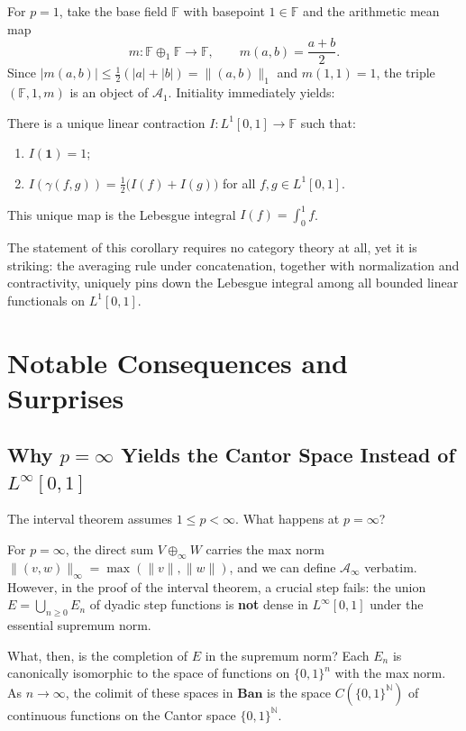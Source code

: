 For $p = 1$, take the base field $\mathbb{F}$ with basepoint $1 \in \mathbb{F}$ and the arithmetic mean map
\[
    m : \mathbb{F} \oplus_1 \mathbb{F} \to \mathbb{F}, \qquad m(a, b) = \frac{a + b}{2}.
\]
Since $|m(a,b)| \le \frac{1}{2}(|a| + |b|) = \|(a,b)\|_1$ and $m(1,1) = 1$, the triple $(\mathbb{F}, 1, m)$ is an object of $\mathcal{A}_1$. Initiality immediately yields:

\begin{corollary}
There is a unique linear contraction $I : L^1[0,1] \to \mathbb{F}$ such that:
\begin{enumerate}
    \item $I(\mathbf{1}) = 1$;
    \item $I(\gamma(f, g)) = \frac{1}{2}\bigl(I(f) + I(g)\bigr)$ for all $f, g \in L^1[0,1]$.
\end{enumerate}
This unique map is the Lebesgue integral $I(f) = \int_0^1 f$.
\end{corollary}

The statement of this corollary requires no category theory at all, yet it is striking: the averaging rule under concatenation, together with normalization and contractivity, uniquely pins down the Lebesgue integral among all bounded linear functionals on $L^1[0,1]$.

\section{Notable Consequences and Surprises}

\subsection{Why $p = \infty$ Yields the Cantor Space Instead of $L^\infty[0,1]$}

The interval theorem assumes $1 \le p < \infty$. What happens at $p = \infty$?

For $p = \infty$, the direct sum $V \oplus_\infty W$ carries the max norm $\|(v, w)\|_\infty = \max(\|v\|, \|w\|)$, and we can define $\mathcal{A}_\infty$ verbatim. However, in the proof of the interval theorem, a crucial step fails: the union $E = \bigcup_{n \ge 0} E_n$ of dyadic step functions is \textbf{not} dense in $L^\infty[0,1]$ under the essential supremum norm.

What, then, is the completion of $E$ in the supremum norm? Each $E_n$ is canonically isomorphic to the space of functions on $\{0,1\}^n$ with the max norm. As $n \to \infty$, the colimit of these spaces in $\mathbf{Ban}$ is the space $C(\{0,1\}^{\mathbb{N}})$ of continuous functions on the Cantor space $\{0,1\}^{\mathbb{N}}$.

